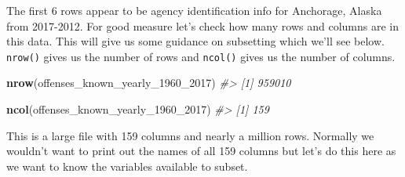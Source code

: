 \documentclass[
  12pt,
]{book}
\newenvironment{Shaded}{\begin{snugshade}}{\end{snugshade}}
\newcommand{\CommentTok}[1]{\textcolor[rgb]{0.56,0.35,0.01}{\textit{#1}}}
\newcommand{\DecValTok}[1]{\textcolor[rgb]{0.00,0.00,0.81}{#1}}
\newcommand{\KeywordTok}[1]{\textcolor[rgb]{0.13,0.29,0.53}{\textbf{#1}}}
\newcommand{\NormalTok}[1]{#1}
\begin{document}
The first 6 rows appear to be agency identification info for Anchorage, Alaska from 2017-2012. For good measure let's check how many rows and columns are in this data. This will give us some guidance on subsetting which we'll see below. \texttt{nrow()} gives us the number of rows and \texttt{ncol()} gives us the number of columns.

\begin{Shaded}
\begin{Highlighting}[]
\KeywordTok{nrow}\NormalTok{(offenses\_known\_yearly\_}\DecValTok{1960}\NormalTok{\_}\DecValTok{2017}\NormalTok{)}
\CommentTok{\#> [1] 959010}
\end{Highlighting}
\end{Shaded}

\begin{Shaded}
\begin{Highlighting}[]
\KeywordTok{ncol}\NormalTok{(offenses\_known\_yearly\_}\DecValTok{1960}\NormalTok{\_}\DecValTok{2017}\NormalTok{)}
\CommentTok{\#> [1] 159}
\end{Highlighting}
\end{Shaded}

This is a large file with 159 columns and nearly a million rows. Normally we wouldn't want to print out the names of all 159 columns but let's do this here as we want to know the variables available to subset.
\end{document}
